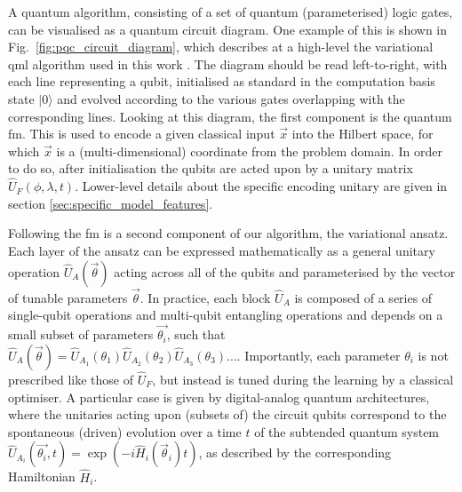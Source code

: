\documentclass[aps,pra,a4paper,twocolumn,longbibliography,groupedaddress]{revtex4-2}
\newcommand{\dvnote}[1]{ {\textcolor{orange} { ***Davide: #1 }}}
\begin{document}
A quantum algorithm, consisting of a set of quantum (parameterised) logic gates, can be visualised as a quantum circuit diagram. One example of this is shown in Fig.~\ref{fig:pqc_circuit_diagram}, which describes at a high-level the variational \gls{qml} algorithm used in this work \cite{cerezo2021variational}. The diagram should be read left-to-right, with each line representing a qubit, initialised as standard in the computation basis state $|0\rangle$ and evolved according to the various gates overlapping with the corresponding lines.
Looking at this diagram, the first component is the quantum \gls{fm}. This is used to encode a given classical input $\vec{x}$ into the Hilbert space, for which $\vec{x}$ is a (multi-dimensional) coordinate from the problem domain. In order to do so, after initialisation the qubits are acted upon by a unitary matrix $\hat{U}_F(\phi, \lambda, t)$. Lower-level details about the specific encoding unitary are given in section \ref{sec:specific_model_features}.


Following the \gls{fm} is a second component of our algorithm, the variational ansatz. Each layer of the ansatz can be expressed mathematically as a general unitary operation $\hat{U}_A(\vec{\theta})$ acting across all of the qubits and parameterised by the vector of tunable parameters $\vec{\theta}$. 
In practice, each block $\hat{U}_A$ is composed of a series of single-qubit operations and multi-qubit entangling operations and depends on a small subset of parameters $\Vec{\theta_i}$, such that $\hat{U}_A(\vec{\theta}) = \hat{U}_{A_1}(\theta_1) \hat{U}_{A_2}(\theta_2)\hat{U}_{A_3}(\theta_3)... $. 
Importantly, each parameter $\theta_i$ is not prescribed like those of $\hat{U}_F$, but instead is tuned during the learning by a classical optimiser. 
A particular case is given by digital-analog quantum architectures, where the unitaries acting upon (subsets of) the circuit qubits correspond to the spontaneous (driven) evolution over a time $t$ of the subtended quantum system $\hat{U}_{A_i} (\Vec{\theta_i}, t) = \exp{(-i \hat{H}_i(\vec{\theta}_i) t)} $, as described by the corresponding Hamiltonian $\hat{H}_i$.
\end{document}
